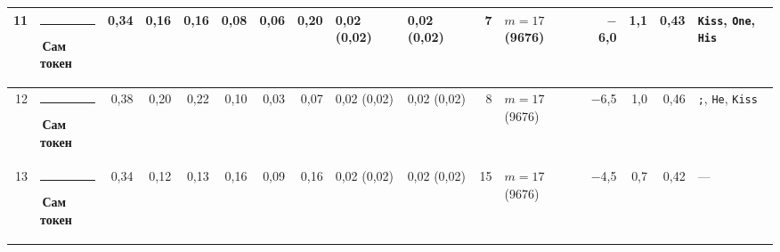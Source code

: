 \documentclass[10pt]{article}
\begin{document}
\begin{minipage}{\linewidth}
\begin{center}
{\begin{tabular}{|r|l|r|r|r|r|r|r|l|l|r|l|r|r|r|l|}
11 & \textcolor[HTML]{2A78D6}{\rule{0.62em}{0.62em}}\,\textbf{Сам токен} & 0,34 & 0,16 & 0,16 & 0,08 & 0,06 & 0,20 & 0,02 (0,02) & 0,02 (0,02) & 7 & $m{=}17$ (9676) & $-$6,0 & 1,1 & 0,43 & \texttt{\textvisiblespace{}Kiss}, \texttt{\textvisiblespace{}One}, \texttt{\textvisiblespace{}His} \\ \hline
12 & \textcolor[HTML]{2A78D6}{\rule{0.62em}{0.62em}}\,\textbf{Сам токен} & 0,38 & 0,20 & 0,22 & 0,10 & 0,03 & 0,07 & 0,02 (0,02) & 0,02 (0,02) & 8 & $m{=}17$ (9676) & $-$6,5 & 1,0 & 0,46 & \texttt{\textvisiblespace{};}, \texttt{\textvisiblespace{}He}, \texttt{\textvisiblespace{}Kiss} \\ \hline
13 & \textcolor[HTML]{2A78D6}{\rule{0.62em}{0.62em}}\,\textbf{Сам токен} & 0,34 & 0,12 & 0,13 & 0,16 & 0,09 & 0,16 & 0,02 (0,02) & 0,02 (0,02) & 15 & $m{=}17$ (9676) & $-$4,5 & 0,7 & 0,42 & — \\ \hline
\hline\end{tabular}}\end{center}
\end{minipage}
\par\vspace{0.4em}
\end{document}

